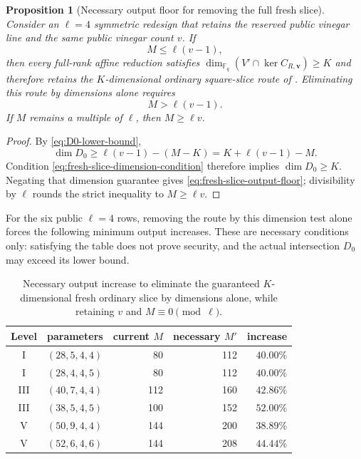 \documentclass[11pt]{article}
\newtheorem{proposition}[proposition]{Proposition}
\newcommand{\F}{\mathbb F}
\begin{document}
\begin{proposition}[Necessary output floor for removing the full fresh slice]
\label{prop:fresh-slice-repair-floor}
Consider an $\ell=4$ symmetric redesign that retains the reserved public
vinegar line and the same public vinegar count $v$.  If
\begin{equation}\label{eq:fresh-slice-dimension-condition}
 M\le \ell(v-1),
\end{equation}
then every full-rank affine reduction satisfies
$\dim_{\F_q}(V'\cap\ker C_{R,\mathbf v})\ge K$ and therefore retains the
$K$-dimensional ordinary square-slice route of
.  Eliminating this route by dimensions alone
requires
\begin{equation}\label{eq:fresh-slice-output-floor}
 M>\ell(v-1).
\end{equation}
If $M$ remains a multiple of $\ell$, then $M\ge\ell v$.
\end{proposition}

\begin{proof}
By \eqref{eq:D0-lower-bound},
\[
 \dim D_0\ge\ell(v-1)-(M-K)
 =K+\ell(v-1)-M.
\]
Condition \eqref{eq:fresh-slice-dimension-condition} therefore implies
$\dim D_0\ge K$.  Negating that dimension guarantee gives
\eqref{eq:fresh-slice-output-floor}; divisibility by $\ell$ rounds the strict
inequality to $M\ge\ell v$.
\end{proof}

For the six public $\ell=4$ rows, removing the route by this dimension test
alone forces the following minimum output increases.  These are necessary
conditions only: satisfying the table does not prove security, and the actual
intersection $D_0$ may exceed its lower bound.

\begin{table}[H]
\centering
\caption{Necessary output increase to eliminate the guaranteed
$K$-dimensional fresh ordinary slice by dimensions alone, while retaining
$v$ and $M\equiv0\pmod\ell$.}
\label{tab:fresh-slice-repair-floor}
\small
\setlength{\tabcolsep}{4.0pt}
\begin{tabular}{@{}c l r r r@{}}
\toprule
Level & parameters & current $M$ & necessary $M'$ & increase\\
\midrule
I   & $(28,5,4,4)$  & 80  & 112 & $40.00\%$\\
I   & $(28,4,4,5)$  & 80  & 112 & $40.00\%$\\
III & $(40,7,4,4)$  & 112 & 160 & $42.86\%$\\
III & $(38,5,4,5)$  & 100 & 152 & $52.00\%$\\
V   & $(50,9,4,4)$  & 144 & 200 & $38.89\%$\\
V   & $(52,6,4,6)$  & 144 & 208 & $44.44\%$\\
\bottomrule
\end{tabular}
\end{table}
\end{document}
